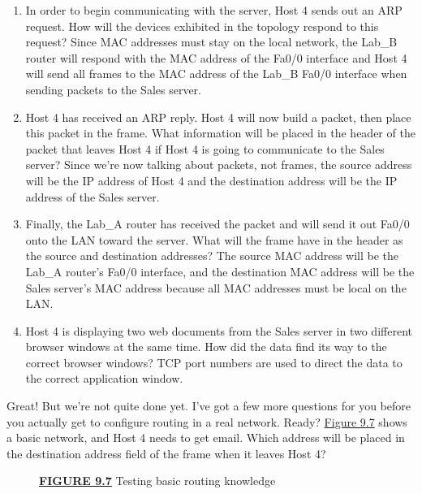 \begin{enumerate}
\tightlist
\item
  In order to begin communicating with the server, Host 4 sends out an
  ARP request. How will the devices exhibited in the topology respond to
  this request? Since MAC addresses must stay on the local network, the
  Lab\_B router will respond with the MAC address of the Fa0/0 interface
  and Host 4 will send all frames to the MAC address of the Lab\_B Fa0/0
  interface when sending packets to the Sales server.
\item
  Host 4 has received an ARP reply. Host 4 will now build a packet, then
  place this packet in the frame. What information will be placed in the
  header of the packet that leaves Host 4 if Host 4 is going to
  communicate to the Sales server? Since we're now talking about
  packets, not frames, the source address will be the IP address of Host
  4 and the destination address will be the IP address of the Sales
  server.
\item
  Finally, the Lab\_A router has received the packet and will send it
  out Fa0/0 onto the LAN toward the server. What will the frame have in
  the header as the source and ­destination addresses? The source MAC
  address will be the Lab\_A router's Fa0/0 interface, and the
  \protect\hypertarget{c09.xhtmlux5cux23Page_371}{}{}destination MAC
  address will be the Sales server's MAC address because all MAC
  addresses must be local on the LAN.
\item
  Host 4 is displaying two web documents from the Sales server in two
  different browser windows at the same time. How did the data find its
  way to the correct browser windows? TCP port numbers are used to
  direct the data to the correct application window.
\end{enumerate}

Great! But we're not quite done yet. I've got a few more questions for
you before you actually get to configure routing in a real network.
Ready? \protect\hyperlink{c09.xhtmlux5cux23figure9-7}{Figure 9.7} shows
a basic network, and Host 4 needs to get email. Which address will be
placed in the destination address field of the frame when it leaves Host
4?

\begin{figure}
\centering
\caption{{\protect\hyperlink{c09.xhtmlux5cux23figureanchor9-7}{\textbf{FIGURE
9.7}} Testing basic routing knowledge}}
\end{figure}

